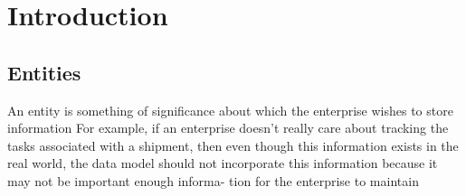 \section*{Introduction}
\justifying

\subsection*{Entities}
An entity is something of significance about which the enterprise wishes to
store information
For example, if an enterprise
doesn't really care about tracking the tasks associated with a shipment, then
even though this information exists in the real world, the data model should not
incorporate this information because it may not be important enough informa-
tion for the enterprise to maintain
